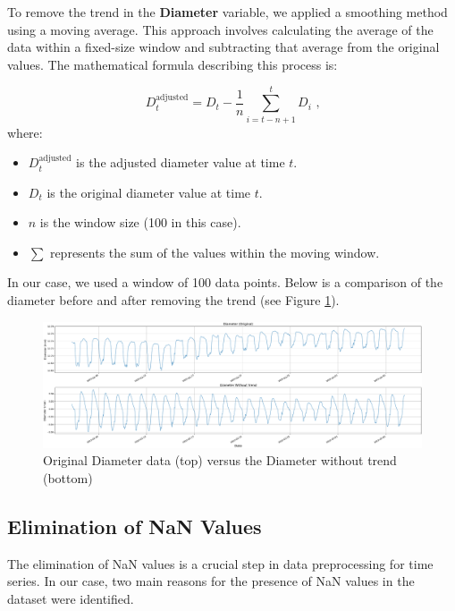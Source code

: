 To remove the trend in the \textbf{Diameter} variable, we applied a smoothing method using a moving average. This approach involves calculating the average of the data within a fixed-size window and subtracting that average from the original values. The mathematical formula describing this process is:

\begin{equation}
D_t^{\text{adjusted}} = D_t - \frac{1}{n} \sum_{i=t-n+1}^{t} D_i \text{ ,}
\end{equation}where:
\begin{itemize}
    \item $D_t^{\text{adjusted}}$ is the adjusted diameter value at time $t$.
    \item $D_t$ is the original diameter value at time $t$.
    \item $n$ is the window size (100 in this case).
    \item $\sum$ represents the sum of the values within the moving window.
\end{itemize}

In our case, we used a window of 100 data points. Below is a comparison of the diameter before and after removing the trend (see Figure \ref{WithoutTrend_Diameter}).

\begin{figure}[htbp]
    \centering
    \includegraphics[width=15 cm]{5_ChapterDesign/figuras/3_Trend/WithoutTrend_Diameter}
    \caption{Original Diameter data (top) versus the Diameter without trend (bottom)}
    \label{WithoutTrend_Diameter}
\end{figure}


\subsection{Elimination of NaN Values}

The elimination of NaN values is a crucial step in data preprocessing for time series. In our case, two main reasons for the presence of NaN values in the dataset were identified.

